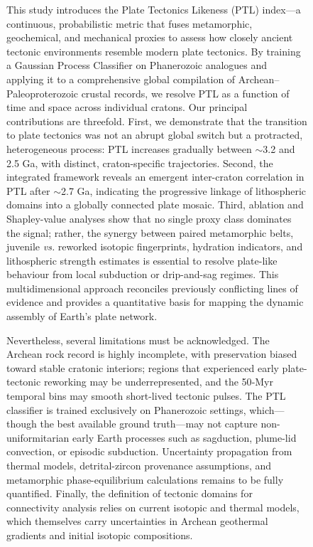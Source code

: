 \documentclass{article}
\begin{document}
\begin{figure}[t]
{This study introduces the Plate Tectonics Likeness (PTL) index—a continuous, probabilistic metric that fuses metamorphic, geochemical, and mechanical proxies to assess how closely ancient tectonic environments resemble modern plate tectonics. By training a Gaussian Process Classifier on Phanerozoic analogues and applying it to a comprehensive global compilation of Archean–Paleoproterozoic crustal records, we resolve PTL as a function of time and space across individual cratons. Our principal contributions are threefold. First, we demonstrate that the transition to plate tectonics was not an abrupt global switch but a protracted, heterogeneous process: PTL increases gradually between $\sim$3.2 and 2.5 Ga, with distinct, craton-specific trajectories. Second, the integrated framework reveals an emergent inter-craton correlation in PTL after $\sim$2.7 Ga, indicating the progressive linkage of lithospheric domains into a globally connected plate mosaic. Third, ablation and Shapley-value analyses show that no single proxy class dominates the signal; rather, the synergy between paired metamorphic belts, juvenile \textit{vs.} reworked isotopic fingerprints, hydration indicators, and lithospheric strength estimates is essential to resolve plate-like behaviour from local subduction or drip-and-sag regimes. This multidimensional approach reconciles previously conflicting lines of evidence and provides a quantitative basis for mapping the dynamic assembly of Earth’s plate network.

Nevertheless, several limitations must be acknowledged. The Archean rock record is highly incomplete, with preservation biased toward stable cratonic interiors; regions that experienced early plate-tectonic reworking may be underrepresented, and the 50‑Myr temporal bins may smooth short-lived tectonic pulses. The PTL classifier is trained exclusively on Phanerozoic settings, which—though the best available ground truth—may not capture non-uniformitarian early Earth processes such as sagduction, plume-lid convection, or episodic subduction. Uncertainty propagation from thermal models, detrital-zircon provenance assumptions, and metamorphic phase-equilibrium calculations remains to be fully quantified. Finally, the definition of tectonic domains for connectivity analysis relies on current isotopic and thermal models, which themselves carry uncertainties in Archean geothermal gradients and initial isotopic compositions.

}
\end{figure}
\end{document}
